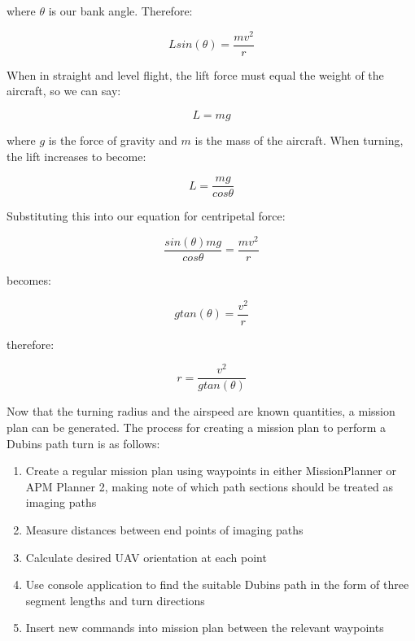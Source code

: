 where $\theta$ is our bank angle. Therefore:

\begin{equation}
	Lsin(\theta) = \frac{mv^2}{r}
\end{equation}

When in straight and level flight, the lift force must equal the weight of the aircraft, so we can say:

\begin{equation}
	L = mg
\end{equation}

where $g$ is the force of gravity and $m$ is the mass of the aircraft. When turning, the lift increases to become:

\begin{equation}
	L = \frac{mg}{cos\theta}
\end{equation}

Substituting this into our equation for centripetal force:

\begin{equation}
	\frac{sin(\theta)mg}{cos\theta} = \frac{mv^2}{r}
\end{equation}
 
 becomes:

\begin{equation}
	gtan(\theta) = \frac{v^2}{r}
\end{equation}

therefore:

\begin{equation} \label{eq:turnradius}
	r = \frac{v^2}{gtan(\theta)}
\end{equation}

Now that the turning radius and the airspeed are known quantities, a mission plan can be generated. The process for creating a mission plan to perform a Dubins path turn is as follows:
\begin{enumerate}
	\item Create a regular mission plan using waypoints in either MissionPlanner or APM Planner 2, making note of which path sections should be treated as imaging paths
	\item Measure distances between end points of imaging paths
	\item Calculate desired UAV orientation at each point
	\item Use console application to find the suitable Dubins path in the form of three segment lengths and turn directions
	\item Insert new commands into mission plan between the relevant waypoints
\end{enumerate}

